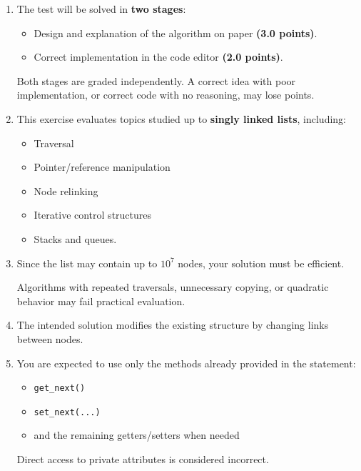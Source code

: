 \documentclass[11pt,a4paper]{article}
\begin{document}
\begin{enumerate}

\item The test will be solved in \textbf{two stages}:

\begin{itemize}
    \item Design and explanation of the algorithm on paper \textbf{(3.0 points)}.
    \item Correct implementation in the code editor \textbf{(2.0 points)}.
\end{itemize}

Both stages are graded independently. A correct idea with poor implementation, or correct code with no reasoning, may lose points.

\item This exercise evaluates topics studied up to \textbf{singly linked lists}, including:

\begin{itemize}
  \item Traversal
  \item Pointer/reference manipulation
  \item Node relinking
  \item Iterative control structures
  \item Stacks and queues.
\end{itemize}

\item Since the list may contain up to \(10^7\) nodes, your solution must be efficient.

Algorithms with repeated traversals, unnecessary copying, or quadratic behavior may fail practical evaluation. 

\item The intended solution modifies the existing structure by changing links between nodes.

\item You are expected to use only the methods already provided in the statement:

\begin{itemize}
    \item \lstinline[style=pythonstyle]|get_next()|
    \item \lstinline[style=pythonstyle]|set_next(...)|
    \item and the remaining getters/setters when needed
\end{itemize}

Direct access to private attributes is considered incorrect.


\end{enumerate}
\end{document}
